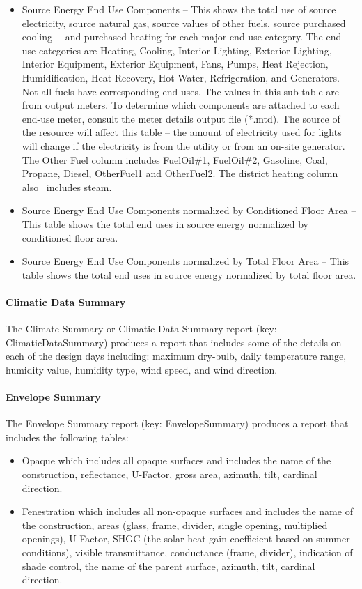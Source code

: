 \begin{itemize}
\item
  Source Energy End Use Components -- This shows the total use of source electricity, source natural gas, source values of other fuels, source purchased cooling~~ and purchased heating for each major end-use category. The end-use categories are Heating, Cooling, Interior Lighting, Exterior Lighting, Interior Equipment, Exterior Equipment, Fans, Pumps, Heat Rejection, Humidification, Heat Recovery, Hot Water, Refrigeration, and Generators. Not all fuels have corresponding end uses. The values in this sub-table are from output meters. To determine which components are attached to each end-use meter, consult the meter details output file (*.mtd). The source of the resource will affect this table -- the amount of electricity used for lights will change if the electricity is from the utility or from an on-site generator. The Other Fuel column includes FuelOil\#1, FuelOil\#2, Gasoline, Coal, Propane, Diesel, OtherFuel1 and OtherFuel2. The district heating column also~ includes steam.
\item
  Source Energy End Use Components normalized by Conditioned Floor Area -- This table shows the total end uses in source energy normalized by conditioned floor area.
\item
  Source Energy End Use Components normalized by Total Floor Area -- This table shows the total end uses in source energy normalized by total floor area.
\end{itemize}

\paragraph{Climatic Data Summary}\label{climatic-data-summary}

The Climate Summary or Climatic Data Summary report (key: ClimaticDataSummary) produces a report that includes some of the details on each of the design days including: maximum dry-bulb, daily temperature range, humidity value, humidity type, wind speed, and wind direction.

\paragraph{Envelope Summary}\label{envelope-summary}

The Envelope Summary report (key: EnvelopeSummary) produces a report that includes the following tables:

\begin{itemize}
\item
  Opaque which includes all opaque surfaces and includes the name of the construction, reflectance, U-Factor, gross area, azimuth, tilt, cardinal direction.
\item
  Fenestration which includes all non-opaque surfaces and includes the name of the construction, areas (glass, frame, divider, single opening, multiplied openings), U-Factor, SHGC (the solar heat gain coefficient based on summer conditions), visible transmittance, conductance (frame, divider), indication of shade control, the name of the parent surface, azimuth, tilt, cardinal direction.
\end{itemize}

